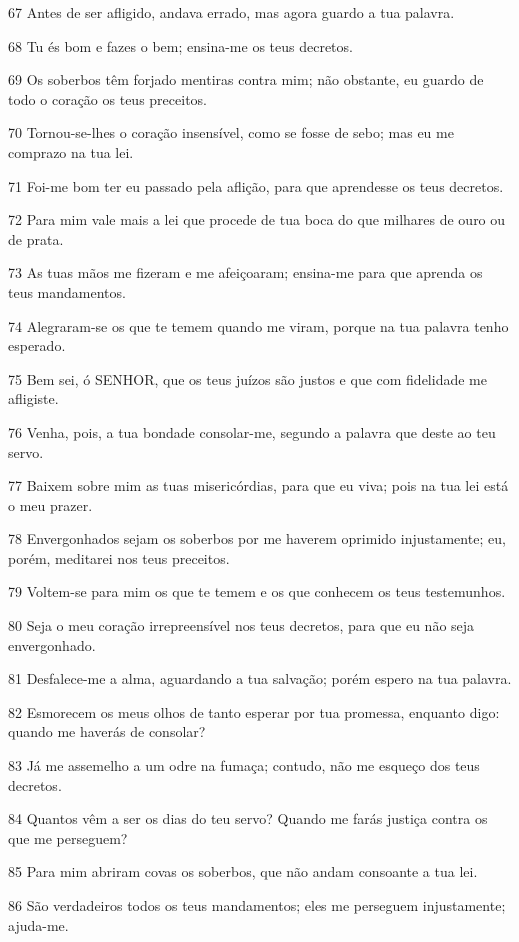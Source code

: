\par 67 Antes de ser afligido, andava errado, mas agora guardo a tua palavra.
\par 68 Tu és bom e fazes o bem; ensina-me os teus decretos.
\par 69 Os soberbos têm forjado mentiras contra mim; não obstante, eu guardo de todo o coração os teus preceitos.
\par 70 Tornou-se-lhes o coração insensível, como se fosse de sebo; mas eu me comprazo na tua lei.
\par 71 Foi-me bom ter eu passado pela aflição, para que aprendesse os teus decretos.
\par 72 Para mim vale mais a lei que procede de tua boca do que milhares de ouro ou de prata.
\par 73 As tuas mãos me fizeram e me afeiçoaram; ensina-me para que aprenda os teus mandamentos.
\par 74 Alegraram-se os que te temem quando me viram, porque na tua palavra tenho esperado.
\par 75 Bem sei, ó SENHOR, que os teus juízos são justos e que com fidelidade me afligiste.
\par 76 Venha, pois, a tua bondade consolar-me, segundo a palavra que deste ao teu servo.
\par 77 Baixem sobre mim as tuas misericórdias, para que eu viva; pois na tua lei está o meu prazer.
\par 78 Envergonhados sejam os soberbos por me haverem oprimido injustamente; eu, porém, meditarei nos teus preceitos.
\par 79 Voltem-se para mim os que te temem e os que conhecem os teus testemunhos.
\par 80 Seja o meu coração irrepreensível nos teus decretos, para que eu não seja envergonhado.
\par 81 Desfalece-me a alma, aguardando a tua salvação; porém espero na tua palavra.
\par 82 Esmorecem os meus olhos de tanto esperar por tua promessa, enquanto digo: quando me haverás de consolar?
\par 83 Já me assemelho a um odre na fumaça; contudo, não me esqueço dos teus decretos.
\par 84 Quantos vêm a ser os dias do teu servo? Quando me farás justiça contra os que me perseguem?
\par 85 Para mim abriram covas os soberbos, que não andam consoante a tua lei.
\par 86 São verdadeiros todos os teus mandamentos; eles me perseguem injustamente; ajuda-me.
